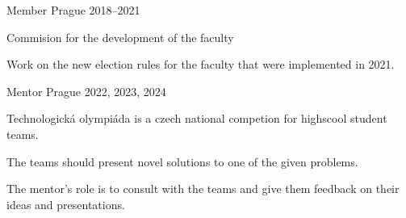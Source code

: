 

\cventry
    {Member} %
    {} %
    {Prague} %
    {2018--2021} %
    {
      \begin{cvitems} %
        \item {Commision for the development of the faculty}
        \item {Work on the new election rules for the faculty that were implemented in 2021.}
      \end{cvitems}
    }

\cventry
    {Mentor} %
    {} %
    {Prague} %
    {2022, 2023, 2024} %
    {
      \begin{cvitems} %
        \item {Technologická olympiáda is a czech national competion for highscool student teams.}
        \item {The teams should present novel solutions to one of the given problems.}
        \item {The mentor's role is to consult with the teams and give them feedback on their ideas and presentations.}
      \end{cvitems}
    }




